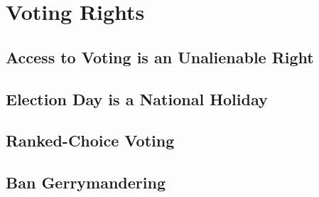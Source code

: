 \section{Voting Rights}

\subsection{Access to Voting is an Unalienable Right}

\subsection{Election Day is a National Holiday}

\subsection{Ranked-Choice Voting}

\subsection{Ban Gerrymandering}